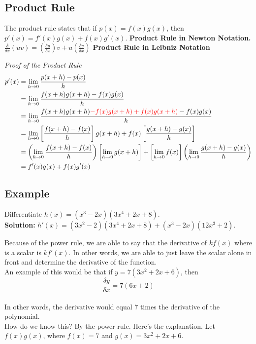 \documentclass{article}
\begin{document}
\subsection{Product Rule}
\begin{tcolorbox}[colback=Orchid!5!snow, colframe=nadeshikopink!50!white,
  colbacktitle=mordantred19!75!mistyrose, title=Product Rule]

The product rule states that if $p(x)=f(x)g(x)$, then\\ $p'(x)=f'(x)g(x)+f(x)g'(x)$.
\textbf{Product Rule in Newton Notation.}\\


$\frac{\delta}{\delta x}(uv)=\left(\frac{\delta u}{\delta x}\right)v+u\left(\frac{\delta v}{\delta x}\right)$
\textbf{Product Rule in Leibniz Notation}

\end{tcolorbox}
\textit{Proof of the Product Rule}
\begin{align*}
    p'(x) &= \lim_{h \to 0}\frac{p(x+h)-p(x)}{h}\\
    &=\lim_{h \to 0}\frac{f(x+h)g(x+h)-f(x)g(x)}{h}\\
    &=\lim_{h \to 0}\frac{f(x+h)g(x+h)\textcolor{red}{-f(x)g(x+h)+f(x)g(x+h)}-f(x)g(x)}{h}\\
    &= \lim_{h \to 0}\left[\frac{f(x+h)-f(x)}{h}\right]g(x+h)+f(x)\left[\frac{g(x+h)-g(x)}{h} \right]\\
    &=\left(\lim_{h \to 0} \frac{f(x+h)-f(x)}{h} \right) \left[\lim_{h \to 0}g(x+h)\right]+\left[\lim_{h \to 0} f(x)\right]\left(\lim_{h \to 0}\frac{g(x+h)-g(x)}{h}  \right)\\
    &=f'(x)g(x)+f(x)g'(x)
\end{align*}
\subsection*{Example}
Differentiate $h(x)=(x^3-2x)(3x^4+2x+8)$.\\
\textbf{Solution:}
$h'(x)=(3x^2-2)(3x^4+2x+8)+(x^3-2x)(12x^3+2)$.

Because of the power rule, we are able to say that the derivative of $kf(x)$ where is a scalar is $kf'(x)$.  In other words, we are able to just leave the scalar alone in front and determine the derivative of the function.\\
An example of this would be that if $y=7(3x^2+2x+6)$, then $$\frac{\delta y}{\delta x}=7(6x+2)$$\\
In other words, the derivative would equal 7 times the derivative of the polynomial.\\
How do we know this? By the power rule. Here’s the explanation.
Let $f(x)g(x)$, where $f(x)=7$ and $g(x)=3x^2+2x+6$.  
\end{document}
